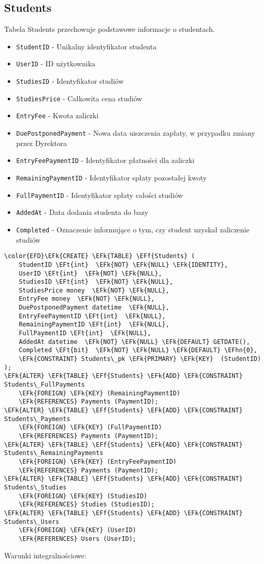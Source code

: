 \documentclass[11pt]{article}
\newcommand{\EFk}[1]{\textcolor{EFk}{\textbf{#1}}} %
\newcommand{\EFf}[1]{\textcolor{EFf}{#1}} %
\newcommand{\EFt}[1]{\textcolor{EFt}{\textbf{#1}}} %
\newcommand{\EFhn}[1]{\textcolor{EFhn}{#1}} %
\begin{document}
\subsection{Students}
\label{sec:org8df5e67}
Tabela Students przechowuje podstawowe informacje o studentach.
\begin{itemize}
\item \texttt{StudentID} - Unikalny identyfikator studenta
\item \texttt{UserID} - ID użytkownika
\item \texttt{StudiesID} - Identyfikator studiów
\item \texttt{StudiesPrice} - Całkowita cena studiów
\item \texttt{EntryFee} - Kwota zaliczki
\item \texttt{DuePostponedPayment} - Nowa data uiszczenia zapłaty, w przypadku zmiany przez Dyrektora
\item \texttt{EntryFeePaymentID} - Identyfikator płatności dla zaliczki
\item \texttt{RemainingPaymentID} - Identyfikator spłaty pozostałej kwoty
\item \texttt{FullPaymentID} - Identyfikator spłaty całości studiów
\item \texttt{AddedAt} - Data dodania studenta do bazy
\item \texttt{Completed} - Oznaczenie informujące o tym, czy student uzyskał zaliczenie studiów
\end{itemize}
\begin{Code}
\begin{Verbatim}
\color{EFD}\EFk{CREATE} \EFk{TABLE} \EFf{Students} (
    StudentID \EFt{int}  \EFk{NOT} \EFk{NULL} \EFk{IDENTITY},
    UserID \EFt{int}  \EFk{NOT} \EFk{NULL},
    StudiesID \EFt{int}  \EFk{NOT} \EFk{NULL},
    StudiesPrice money  \EFk{NOT} \EFk{NULL},
    EntryFee money  \EFk{NOT} \EFk{NULL},
    DuePostponedPayment datetime  \EFk{NULL},
    EntryFeePaymentID \EFt{int}  \EFk{NULL},
    RemainingPaymentID \EFt{int}  \EFk{NULL},
    FullPaymentID \EFt{int}  \EFk{NULL},
    AddedAt datetime  \EFk{NOT} \EFk{NULL} \EFk{DEFAULT} GETDATE(),
    Completed \EFt{bit}  \EFk{NOT} \EFk{NULL} \EFk{DEFAULT} \EFhn{0},
    \EFk{CONSTRAINT} Students\_pk \EFk{PRIMARY} \EFk{KEY}  (StudentID)
);
\EFk{ALTER} \EFk{TABLE} \EFf{Students} \EFk{ADD} \EFk{CONSTRAINT} Students\_FullPayments
    \EFk{FOREIGN} \EFk{KEY} (RemainingPaymentID)
    \EFk{REFERENCES} Payments (PaymentID);
\EFk{ALTER} \EFk{TABLE} \EFf{Students} \EFk{ADD} \EFk{CONSTRAINT} Students\_Payments
    \EFk{FOREIGN} \EFk{KEY} (FullPaymentID)
    \EFk{REFERENCES} Payments (PaymentID);
\EFk{ALTER} \EFk{TABLE} \EFf{Students} \EFk{ADD} \EFk{CONSTRAINT} Students\_RemainingPayments
    \EFk{FOREIGN} \EFk{KEY} (EntryFeePaymentID)
    \EFk{REFERENCES} Payments (PaymentID);
\EFk{ALTER} \EFk{TABLE} \EFf{Students} \EFk{ADD} \EFk{CONSTRAINT} Students\_Studies
    \EFk{FOREIGN} \EFk{KEY} (StudiesID)
    \EFk{REFERENCES} Studies (StudiesID);
\EFk{ALTER} \EFk{TABLE} \EFf{Students} \EFk{ADD} \EFk{CONSTRAINT} Students\_Users
    \EFk{FOREIGN} \EFk{KEY} (UserID)
    \EFk{REFERENCES} Users (UserID);
\end{Verbatim}
\end{Code}
Warunki integralnościowe:
\end{document}

